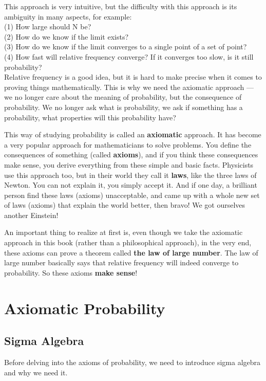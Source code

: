 \documentclass[a4paper,12pt]{article}
\begin{document}
This approach is very intuitive, but the difficulty with this approach is its ambiguity in many aspects, for example:\\
(1) How large should N be?\\
(2) How do we know if the limit exists?\\
(3) How do we know if the limit converges to a single point of a set of point?\\
(4) How fast will relative frequency converge? If it converges too slow, is it still probability?\\

Relative frequency is a good idea, but it is hard to make precise when it comes to proving things mathematically. This is why we need the axiomatic approach \---- we no longer care about the meaning of probability, but the consequence of probability. We no longer ask what is probability, we ask if something has a probability, what properties will this probability have?

This way of studying probability is called an \textbf{axiomatic} approach. It has become a very popular approach for mathematicians to solve problems. You define the consequences of something (called \textbf{axioms}), and if you think these consequences make sense, you derive everything from these simple and basic facts. Physicists use this approach too, but in their world they call it \textbf{laws}, like the three laws of Newton. You can not explain it, you simply accept it. And if one day, a brilliant person find these laws (axioms) unacceptable, and came up with a whole new set of laws (axioms) that explain the world better, then bravo! We got ourselves another Einstein!

An important thing to realize at first is, even though we take the axiomatic approach in this book (rather than a philosophical approach), in the very end, these axioms can prove a theorem called \textbf{the law of large number}. The law of large number basically says that relative frequency will indeed converge to probability. So these axioms \textbf{make sense}!

\newpage
\section{Axiomatic Probability}
\subsection{Sigma Algebra}
Before delving into the axioms of probability, we need to introduce sigma algebra and why we need it.\\
\end{document}
